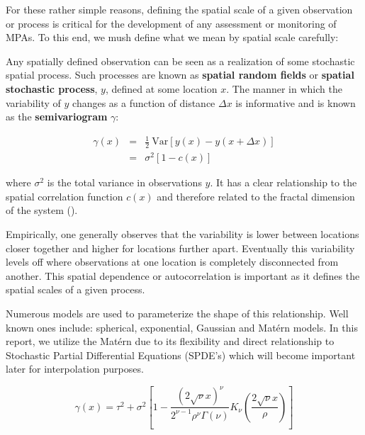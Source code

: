 \documentclass[letterpaper,portrait,11pt]{scrartcl}
\numberwithin{equation}{section}		%
\numberwithin{figure}{section}		%
\numberwithin{table}{section}				%
\begin{document}
For these rather simple reasons, defining the spatial scale of a given observation or process is critical for the development of any assessment or monitoring of MPAs. To this end, we mush define what we mean by spatial scale carefully:

Any spatially defined observation can be seen as a realization of some stochastic spatial process. Such  processes are known as \textbf{spatial random fields} or \textbf{spatial stochastic process}, $y$, defined at some location $x$. The manner in which the variability of $y$ changes as a function of distance $\Delta x$ is informative and is known as the \textbf{semivariogram} $\gamma$:

\begin{eqnarray*}
\label{eq:semivariogram}
\gamma(x) &=& \frac{1}{2} \ \textrm{Var} [ y(x) - y(x + \Delta x)]  \\
&=& \sigma^2 [1-c(x)] 
\end{eqnarray*}

where $\sigma^2$ is the total variance in observations $y$. It has a clear relationship to the spatial correlation function $c(x)$ and therefore related to the fractal dimension of the system (\cite{Schepers:2002:fractals}). 

Empirically, one generally observes that the variability is lower between locations closer together and higher for locations further apart. Eventually this variability levels off where observations at one location is completely disconnected from another. This spatial dependence or autocorrelation is important as it defines the spatial scales of a given process. 

Numerous models are used to parameterize the shape of this relationship. Well known ones include: spherical, exponential, Gaussian and Mat\'{e}rn models. In this report, we utilize the Mat\'{e}rn due to its flexibility and direct relationship to Stochastic Partial Differential Equations (SPDE's) which will become important later for interpolation purposes. 

\begin{equation}
\gamma(x) = \tau^2 + \sigma^2 [ 1 - \frac{{(2\sqrt{\nu}x)}^\nu}{2^{\nu-1} \rho^{\nu} \Gamma(\nu)}
 K_\nu(\frac{2\sqrt{\nu}x}{\rho} ) ]
\end{equation}
\end{document}
